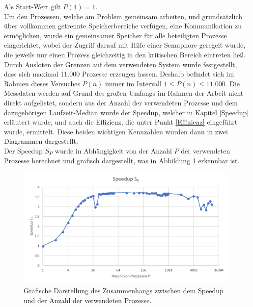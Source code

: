 \begin{description}
						Als Start-Wert gilt $P(1) = 1$.\\
						Um den Prozessen, welche am Problem gemeinsam arbeiten, und grundsätzlich über vollkommen getrennte Speicherbereiche verfügen, eine Kommunikation zu ermöglichen, wurde ein gemeinsamer Speicher für alle beteiligten Prozesse eingerichtet, wobei der Zugriff darauf mit Hilfe einer Semaphore geregelt wurde, die jeweils nur einen Prozess gleichzeitig in den kritischen Bereich eintreten ließ.\\
						Durch Ausloten der Grenzen auf dem verwendeten System wurde festgestellt, dass sich maximal 11.000 Prozesse erzeugen lassen. Deshalb befindet sich im Rahmen dieses Versuches $P(n)$ immer im Intervall $1 \leq P(n) \leq 11.000$.
						Die Messdaten werden auf Grund des großen Umfangs im Rahmen der Arbeit nicht direkt aufgelistet, sondern aus der Anzahl der verwendeten Prozesse und dem dazugehörigen Laufzeit-Median wurde der Speedup, welcher in Kapitel \ref{Speedup} erläutert wurde, und auch die Effizienz, die unter Punkt \ref{Effizienz} eingeführt wurde, ermittelt. Diese beiden wichtigen Kennzahlen wurden dann in zwei Diagrammen dargestellt.\\
						Der Speedup $S_P$ wurde in Abhängigkeit von der Anzahl $P$ der verwendeten Prozesse berechnet und grafisch dargestellt, was in Abbildung \ref{fig:Speedup_Prozesse} erkennbar ist.
						
						\begin{figure}
							\centering	
							\includegraphics[width=11cm]{Abbildungen/Speedup_Prozesse.png}
							\caption{Grafische Darstellung des Zusammenhangs zwischen dem Speedup und der Anzahl der verwendeten Prozesse.}
							\label{fig:Speedup_Prozesse}
						\end{figure}
					

\end{description}
